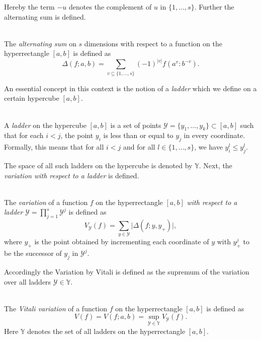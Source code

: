 Hereby the term $-u$ denotes the complement of $u$ in $\{1, \dots, s\}$. Further
the alternating sum is defined.

\begin{definition} \ \\
    The \emph{alternating sum} on $s$ dimensions with respect to a function on
    the hyperrectangle $[a,b]$ is defined as
    \begin{equation*}
        \Delta(f; a, b) = \sum_{v \subseteq \{1,\dots,s\}} (-1)^{|v|} f(a^v:b^{-v}).
    \end{equation*}
\end{definition}

An essential concept in this context is the notion of a \emph{ladder} which we
define on a certain hypercube $[a,b]$.

\begin{definition}[Ladder] \ \\
    A \emph{ladder} on the hypercube $[a,b]$ is a set of points $\mathcal{Y} =
    \{y_1, \dots, y_k\} \subset [a,b]$ such that for each $i < j$, the point
    $y_i$ is less than or equal to $y_j$ in every coordinate. Formally, this
    means that for all $i < j$ and for all $l \in \{1, \dots, s\}$, we have
    $y_i^l \leq y_j^l$.
\end{definition}

The space of all such ladders on the hypercube is denoted by $\mathbb{Y}$. Next,
the \emph{variation with respect to a ladder} is defined.

\begin{definition} \ \\
    The \emph{variation} of a function $f$ on the hyperrectangle $[a,b]$
    \emph{with respect to a ladder}
    $\mathcal{Y} = \prod\limits_{j=1}^s \mathcal{Y}^j$ is defined as
    \begin{equation*}
        V_\mathcal{Y}(f) = \sum_{y \in \mathcal{Y}} \big| \Delta(f; y, y_+) \big|,
    \end{equation*}
    where $y_+$ is the point obtained by incrementing each coordinate of $y$
    with $y^j_+$ to be the successor of $y_j$ in $\mathcal{Y}^j$.
\end{definition}

Accordingly the Variation by Vitali is defined as the supremum of the variation
over all ladders $\mathcal{Y} \in \mathbb{Y}$.

\begin{definition} \ \\
    The \emph{Vitali variation} of a function $f$ on the hyperrectangle $[a,b]$
    is defined as
    \begin{equation*}
        V(f) = V(f; a, b) = \sup_{\mathcal{Y} \in \mathbb{Y}} V_\mathcal{Y}(f).
    \end{equation*}
    Here $\mathbb{Y}$ denotes the set of all ladders on the hyperrectangle
    $[a,b]$.
\end{definition}

